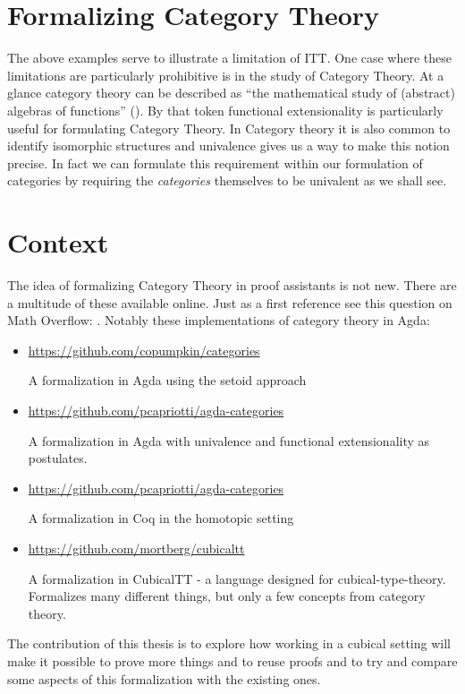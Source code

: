 \section{Formalizing Category Theory}
%
The above examples serve to illustrate a limitation of ITT. One case where these
limitations are particularly prohibitive is in the study of Category Theory. At
a glance category theory can be described as ``the mathematical study of
(abstract) algebras of functions'' (\cite{awodey-2006}). By that token
functional extensionality is particularly useful for formulating Category
Theory. In Category theory it is also common to identify isomorphic structures
and univalence gives us a way to make this notion precise. In fact we can
formulate this requirement within our formulation of categories by requiring the
\emph{categories} themselves to be univalent as we shall see.

\section{Context}
%
The idea of formalizing Category Theory in proof assistants is not new. There
are a multitude of these available online. Just as a first reference see this
question on Math Overflow: \cite{mo-formalizations}. Notably these
implementations of category theory in Agda:
%
\begin{itemize}
\item
  \url{https://github.com/copumpkin/categories}

  A formalization in Agda using the setoid approach
\item
  \url{https://github.com/pcapriotti/agda-categories}

  A formalization in Agda with univalence and functional extensionality as
  postulates.
\item
  \url{https://github.com/pcapriotti/agda-categories}

  A formalization in Coq in the homotopic setting
\item
  \url{https://github.com/mortberg/cubicaltt}

  A formalization in CubicalTT - a language designed for cubical-type-theory.
  Formalizes many different things, but only a few concepts from category
  theory.

\end{itemize}
%
The contribution of this thesis is to explore how working in a cubical setting
will make it possible to prove more things and to reuse proofs and to try and
compare some aspects of this formalization with the existing ones.


